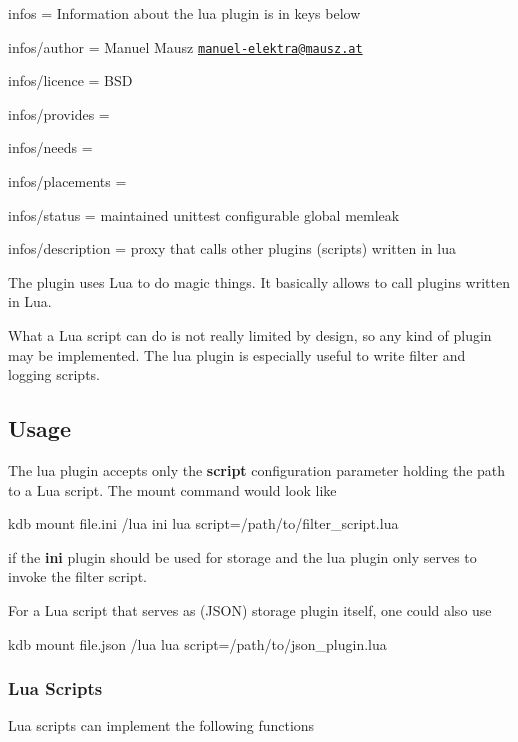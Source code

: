 
\begin{DoxyItemize}
\item infos = Information about the lua plugin is in keys below
\item infos/author = Manuel Mausz \href{mailto:manuel-elektra@mausz.at}{\tt manuel-\/elektra@mausz.\+at}
\item infos/licence = B\+SD
\item infos/provides =
\item infos/needs =
\item infos/placements =
\item infos/status = maintained unittest configurable global memleak
\item infos/description = proxy that calls other plugins (scripts) written in lua
\end{DoxyItemize}

The plugin uses Lua to do magic things. It basically allows to call plugins written in Lua.

What a Lua script can do is not really limited by design, so any kind of plugin may be implemented. The lua plugin is especially useful to write filter and logging scripts.

\subsection*{Usage}

The lua plugin accepts only the {\bfseries script} configuration parameter holding the path to a Lua script. The mount command would look like \begin{DoxyVerb}kdb mount file.ini /lua ini lua script=/path/to/filter_script.lua
\end{DoxyVerb}


if the {\bfseries ini} plugin should be used for storage and the lua plugin only serves to invoke the filter script.

For a Lua script that serves as (J\+S\+ON) storage plugin itself, one could also use \begin{DoxyVerb}kdb mount file.json /lua lua script=/path/to/json_plugin.lua
\end{DoxyVerb}


\subsubsection*{Lua Scripts}

Lua scripts can implement the following functions


